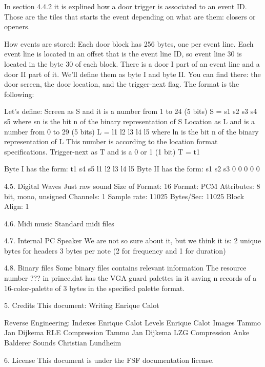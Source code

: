  In section 4.4.2 it is explined how a door trigger is associated to an
 event ID. Those are the tiles that starts the event depending on what are
 them: closers or openers.

 How events are stored:
 Each door block has 256 bytes, one per event line. Each event line is
 located in an offset that is the event line ID, so event line 30 is
 located in the byte 30 of each block.
 There is a door I part of an event line and a door II part of it. We'll
 define them as byte I and byte II.
 You can find there: the door screen, the door location, and the
 trigger-next flag. The format is the following:
 
 Let's define:
  Screen as S and it is a number from 1 to 24 (5 bits)
	 S = s1 s2 s3 s4 s5 where sn is the bit n of the binary representation of S
	Location as L and is a number from 0 to 29 (5 bits)
	 L = l1 l2 l3 l4 l5 where ln is the bit n of the binary representation of L
	 This number is according to the location format specifications.
	Trigger-next as T and is a 0 or 1 (1 bit)
   T = t1

 Byte I  has the form: t1 s4 s5 l1 l2 l3 l4 l5
 Byte II has the form: s1 s2 s3  0  0  0  0  0

4.5. Digital Waves
Just raw sound
 Size of Format: 16
 Format: PCM
 Attributes: 8 bit, mono, unsigned
 Channels: 1
 Sample rate: 11025
 Bytes/Sec: 11025
 Block Align: 1
 
4.6. Midi music
 Standard midi files

4.7. Internal PC Speaker
 We are not so sure about it, but we think it is:
  2 unique bytes for headers
  3 bytes per note (2 for frequency and 1 for duration)
 
4.8. Binary files
 Some binary files contains relevant information
 The resource number ??? in prince.dat has the VGA guard palettes in it
 saving n records of a 16-color-palette of 3 bytes in the specified palette
 format.

5. Credits
 This document:
  Writing                    Enrique Calot

 Reverse Engineering:
  Indexes                    Enrique Calot
  Levels                     Enrique Calot
  Images                 Tammo Jan Dijkema
  RLE Compression        Tammo Jan Dijkema
  LZG Compression            Anke Balderer
  Sounds                Christian Lundheim

6. License
 This document is under the FSF documentation license.
